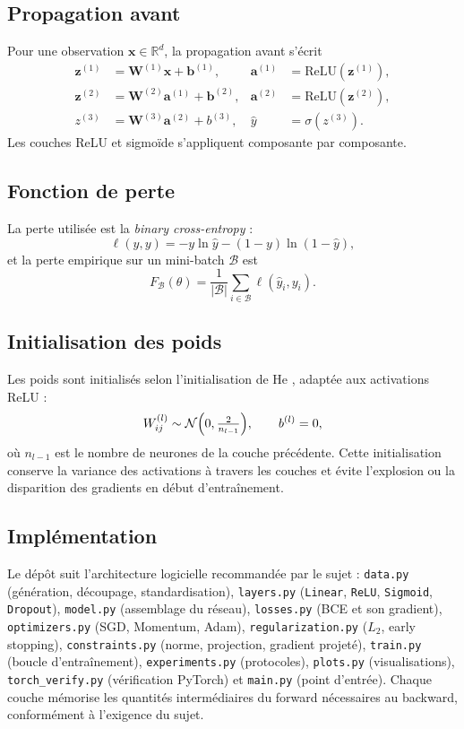 \documentclass[11pt,a4paper]{article}
\newcommand{\R}{\mathbb{R}}
\newcommand{\vect}[1]{\mathbf{#1}}
\begin{document}
\subsection{Propagation avant}

Pour une observation $\vect{x} \in \R^d$, la propagation avant s'écrit
\begin{align}
\vect{z}^{(1)} &= \vect{W}^{(1)} \vect{x} + \vect{b}^{(1)}, &
\vect{a}^{(1)} &= \mathrm{ReLU}(\vect{z}^{(1)}), \label{eq:fwd1}\\
\vect{z}^{(2)} &= \vect{W}^{(2)} \vect{a}^{(1)} + \vect{b}^{(2)}, &
\vect{a}^{(2)} &= \mathrm{ReLU}(\vect{z}^{(2)}), \label{eq:fwd2}\\
z^{(3)} &= \vect{W}^{(3)} \vect{a}^{(2)} + b^{(3)}, &
\hat y &= \sigma(z^{(3)}). \label{eq:fwd3}
\end{align}
Les couches ReLU et sigmoïde s'appliquent composante par composante.

\subsection{Fonction de perte}

La perte utilisée est la \emph{binary cross-entropy} :
\[
\ell(\hat y, y) = -y \ln \hat y - (1-y) \ln (1-\hat y),
\]
et la perte empirique sur un mini-batch $\mathcal{B}$ est
\[
F_{\mathcal{B}}(\theta) = \frac{1}{|\mathcal{B}|} \sum_{i \in \mathcal{B}} \ell(\hat y_i, y_i).
\]

\subsection{Initialisation des poids}

Les poids sont initialisés selon l'initialisation de He \cite{he2015}, adaptée aux activations ReLU :
\[
W^{(l)}_{ij} \sim \mathcal{N}\Bigl(0, \tfrac{2}{n_{l-1}}\Bigr),
\qquad b^{(l)} = 0,
\]
où $n_{l-1}$ est le nombre de neurones de la couche précédente. Cette initialisation conserve la variance des activations à travers les couches et évite l'explosion ou la disparition des gradients en début d'entraînement.

\subsection{Implémentation}

Le dépôt suit l'architecture logicielle recommandée par le sujet :
\texttt{data.py} (génération, découpage, standardisation), \texttt{layers.py} (\texttt{Linear}, \texttt{ReLU}, \texttt{Sigmoid}, \texttt{Dropout}), \texttt{model.py} (assemblage du réseau), \texttt{losses.py} (BCE et son gradient), \texttt{optimizers.py} (SGD, Momentum, Adam), \texttt{regularization.py} ($L_2$, early stopping), \texttt{constraints.py} (norme, projection, gradient projeté), \texttt{train.py} (boucle d'entraînement), \texttt{experiments.py} (protocoles), \texttt{plots.py} (visualisations), \texttt{torch\_verify.py} (vérification PyTorch) et \texttt{main.py} (point d'entrée). Chaque couche mémorise les quantités intermédiaires du forward nécessaires au backward, conformément à l'exigence du sujet.
\end{document}
